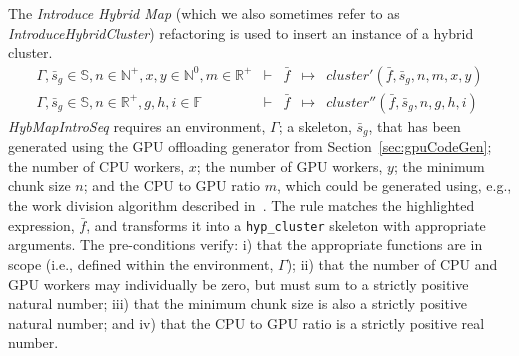 \documentclass[final]{jfp1}
\newcommand{\f}[0]{\bar{f}}
\newcommand{\s}[0]{\bar{s}}
\newcommand{\blf}[0]{\mathbb{F}}
\newcommand{\bs}[0]{\mathbb{S}}
\newcommand{\bn}[0]{\mathbb{N}}
\newcommand{\br}[0]{\mathbb{R}}
\newcommand{\bnp}[0]{\bn^{+}}
\newcommand{\bnz}[0]{\bn^{0}}
\newcommand{\brp}[0]{\br^{+}}
\newcommand{\rewrite}[3]{#1 & \vdash{} & #2 & \mapsto{} & #3}
\begin{document}
The \emph{Introduce Hybrid Map} (which we also sometimes refer to as \emph{IntroduceHybridCluster}) refactoring is used to insert an instance of a
hybrid cluster.
% 
\[
  \begin{array}{lrclcl} %
    \rewrite{\Gamma, \s_g \in \bs, n \in \bnp, x,y \in \bnz, m \in
    \brp}{\f}{cluster'(\f, \s_g, n, m, x, y)} \\
    \rewrite{\Gamma, \s_g \in \bs, n \in \brp, g,h,i \in \blf}{\f}{cluster''(\f,
    \s_g, n, g, h, i)}
  \end{array}
\]
% 
\noindent
\emph{HybMapIntroSeq} requires
an environment, $\Gamma$;
a skeleton, $\s_g$, that has been generated using the GPU offloading generator
from Section~\ref{sec:gpuCodeGen}; the number of CPU workers, $x$; the
number of GPU workers, $y$; the minimum chunk size $n$; and the CPU to GPU ratio
$m$, which could be generated using, e.g., the work division algorithm described in~\cite{parco2015}. 
% 
%
The rule matches the highlighted expression,
$\f$, and transforms it into a \lstinline|hyp_cluster| skeleton with appropriate
arguments. 
The pre-conditions verify: i) that
the appropriate functions are in scope (i.e., defined within the environment,
$\Gamma$); ii) that the number of CPU and GPU workers may individually be zero,
but must sum to a strictly positive natural number; iii) that the minimum chunk
size is also a strictly positive natural number; and iv) that the CPU to GPU
ratio is a strictly positive real number. 
\end{document}
